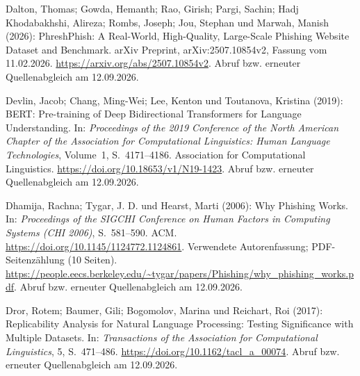 \par\smallskip
\begin{samepage}
\noindent
Dalton, Thomas; Gowda, Hemanth; Rao, Girish; Pargi, Sachin;
Hadj Khodabakhshi, Alireza; Rombs, Joseph; Jou, Stephan und Marwah, Manish (2026):
PhreshPhish: A Real-World, High-Quality, Large-Scale Phishing Website Dataset and Benchmark.
arXiv Preprint, arXiv:2507.10854v2, Fassung vom 11.02.2026.
\url{https://arxiv.org/abs/2507.10854v2}.
Abruf bzw. erneuter Quellenabgleich am 12.09.2026.
\par\end{samepage}
\par\smallskip
\begin{samepage}
\noindent
Devlin, Jacob; Chang, Ming-Wei; Lee, Kenton und Toutanova, Kristina (2019):
BERT: Pre-training of Deep Bidirectional Transformers for Language Understanding.
In: \textit{Proceedings of the 2019 Conference of the North American Chapter
of the Association for Computational Linguistics: Human Language Technologies},
Volume~1, S.~4171--4186.
Association for Computational Linguistics.
\url{https://doi.org/10.18653/v1/N19-1423}.
Abruf bzw. erneuter Quellenabgleich am 12.09.2026.
\par\end{samepage}
\par\smallskip
\begin{samepage}
\noindent
Dhamija, Rachna; Tygar, J. D. und Hearst, Marti (2006):
Why Phishing Works.
In: \textit{Proceedings of the SIGCHI Conference on Human Factors in Computing Systems
(CHI 2006)}, S.~581--590.
ACM.
\url{https://doi.org/10.1145/1124772.1124861}.
Verwendete Autorenfassung; PDF-Seitenzählung (10 Seiten). \url{https://people.eecs.berkeley.edu/~tygar/papers/Phishing/why_phishing_works.pdf}.
Abruf bzw. erneuter Quellenabgleich am 12.09.2026.
\par\end{samepage}
\par\smallskip
\begin{samepage}
\noindent
Dror, Rotem; Baumer, Gili; Bogomolov, Marina und Reichart, Roi (2017):
Replicability Analysis for Natural Language Processing:
Testing Significance with Multiple Datasets.
In: \textit{Transactions of the Association for Computational Linguistics},
5, S.~471--486.
\url{https://doi.org/10.1162/tacl_a_00074}.
Abruf bzw. erneuter Quellenabgleich am 12.09.2026.
\par\end{samepage}
\par\smallskip
